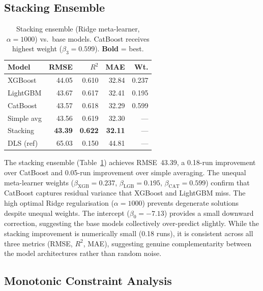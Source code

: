 \documentclass[10pt,a4paper,twocolumn]{article}
\begin{document}
\subsection{Stacking Ensemble}

\begin{table}[htbp]
\centering
\caption{Stacking ensemble (Ridge meta-learner, $\alpha=1000$) vs.\ base models. CatBoost receives highest weight ($\beta_3=0.599$). \textbf{Bold} = best.}
\label{tab:stacking}
\small
\begin{tabular}{lrrrr}
\toprule
\textbf{Model} & \textbf{RMSE} & $R^2$ & \textbf{MAE} & \textbf{Wt.} \\
\midrule
XGBoost       & 44.05 & 0.610 & 32.84 & 0.237 \\
LightGBM      & 43.67 & 0.617 & 32.41 & 0.195 \\
CatBoost      & 43.57 & 0.618 & 32.29 & 0.599 \\
Simple avg    & 43.56 & 0.619 & 32.30 & --- \\
Stacking      & \textbf{43.39} & \textbf{0.622} & \textbf{32.11} & --- \\
\midrule
DLS (ref)     & 65.03 & 0.150 & 44.81 & --- \\
\bottomrule
\end{tabular}
\end{table}

The stacking ensemble (Table~\ref{tab:stacking}) achieves RMSE~43.39, a 0.18-run improvement over CatBoost and 0.05-run improvement over simple averaging. The unequal meta-learner weights ($\beta_\text{XGB}=0.237$, $\beta_\text{LGB}=0.195$, $\beta_\text{CAT}=0.599$) confirm that CatBoost captures residual variance that XGBoost and LightGBM miss. The high optimal Ridge regularisation ($\alpha=1000$) prevents degenerate solutions despite unequal weights. The intercept ($\beta_0 = -7.13$) provides a small downward correction, suggesting the base models collectively over-predict slightly. While the stacking improvement is numerically small (0.18 runs), it is consistent across all three metrics (RMSE, $R^2$, MAE), suggesting genuine complementarity between the model architectures rather than random noise.

\subsection{Monotonic Constraint Analysis}
\end{document}
